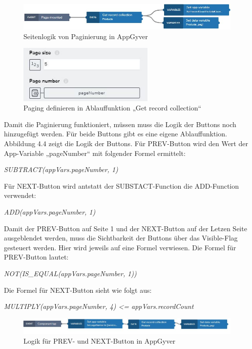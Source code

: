 \begin{figure}[htbp]
 \centering
 \includegraphics[width=1.0\textwidth]{Bilder/appgyver/4_2_Seitenlogic paginierung.jpg}
 \caption{Seitenlogik von Paginierung in AppGyver}
\end{figure}
 
\begin{figure}[htbp]
 \centering
 \includegraphics[width=0.6\textwidth]{Bilder/appgyver/4_3_Paging_definieren.jpg}
 \caption{Paging definieren in Ablauffunktion „Get record collection“}
\end{figure}

Damit die Paginierung funktioniert, müssen muss die Logik der Buttons noch hinzugefügt werden. Für beide Buttons gibt es eine eigene Ablauffunktion. Abbildung 4.4 zeigt die Logik der Buttons. Für PREV-Button wird den Wert der App-Variable „pageNumber“ mit folgender Formel ermittelt:

\textit{SUBTRACT(appVars.pageNumber, 1)}

Für NEXT-Button wird antstatt der SUBSTACT-Function die ADD-Function verwendet:

\textit{ADD(appVars.pageNumber, 1)}

Damit der PREV-Button auf Seite 1 und der NEXT-Button auf der Letzen Seite ausgeblendet werden, muss die Sichtbarkeit der Buttons über das Visible-Flag gesteuert werden. Hier wird jeweils auf eine Formel verwiesen. Die Formel für PREV-Button lautet: 

\textit{NOT(IS\_EQUAL(appVars.pageNumber, 1))}

Die Formel für NEXT-Button sieht wie folgt aus:

\textit{MULTIPLY(appVars.pageNumber, 4) <= appVars.recordCount}

\begin{figure}[htbp]
 \centering
 \includegraphics[width=1.0\textwidth]{Bilder/appgyver/4_4_Logik_PREV_und_NEXT.jpg}
 \caption{Logik für PREV- und NEXT-Button in AppGyver}
\end{figure}

